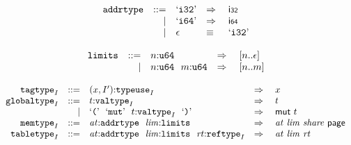 \vspace{1ex}

$$
\begin{array}[t]{@{}lrrl@{}l@{}l@{}l@{}}
& {\mathtt{addrtype}} & ::= & \mbox{‘\texttt{i32}’} & \quad\Rightarrow\quad{} & \mathsf{i{\scriptstyle 32}} \\
& & | & \mbox{‘\texttt{i64}’} & \quad\Rightarrow\quad{} & \mathsf{i{\scriptstyle 64}} \\
& & | & \epsilon & \quad\equiv\quad{} & \mbox{‘\texttt{i32}’} \\
\end{array}
$$

\vspace{1ex}

$$
\begin{array}[t]{@{}lrrl@{}l@{}l@{}l@{}}
& {\mathtt{limits}} & ::= & n{:}{\mathtt{u64}} & \quad\Rightarrow\quad{} & {}[ n .. \epsilon ] \\
& & | & n{:}{\mathtt{u64}}~~m{:}{\mathtt{u64}} & \quad\Rightarrow\quad{} & {}[ n .. m ] \\
\end{array}
$$

\vspace{1ex}

$$
\begin{array}[t]{@{}lrrl@{}l@{}l@{}l@{}}
& {{\mathtt{tagtype}}}_{I} & ::= & (x, {I'}){:}{{\mathtt{typeuse}}}_{I} & \quad\Rightarrow\quad{} & x \\
& {{\mathtt{globaltype}}}_{I} & ::= & t{:}{{\mathtt{valtype}}}_{I} & \quad\Rightarrow\quad{} & t \\
& & | & \mbox{‘\texttt{{(}}’}~~\mbox{‘\texttt{mut}’}~~t{:}{{\mathtt{valtype}}}_{I}~~\mbox{‘\texttt{{)}}’} & \quad\Rightarrow\quad{} & \mathsf{mut}~t \\
& {{\mathtt{memtype}}}_{I} & ::= & {\mathit{at}}{:}{\mathtt{addrtype}}~~{\mathit{lim}}{:}{\mathtt{limits}} & \quad\Rightarrow\quad{} & {\mathit{at}}~{\mathit{lim}}~{\mathit{share}}~\mathsf{page} \\
& {{\mathtt{tabletype}}}_{I} & ::= & {\mathit{at}}{:}{\mathtt{addrtype}}~~{\mathit{lim}}{:}{\mathtt{limits}}~~{\mathit{rt}}{:}{{\mathtt{reftype}}}_{I} & \quad\Rightarrow\quad{} & {\mathit{at}}~{\mathit{lim}}~{\mathit{rt}} \\
\end{array}
$$

\vspace{1ex}

